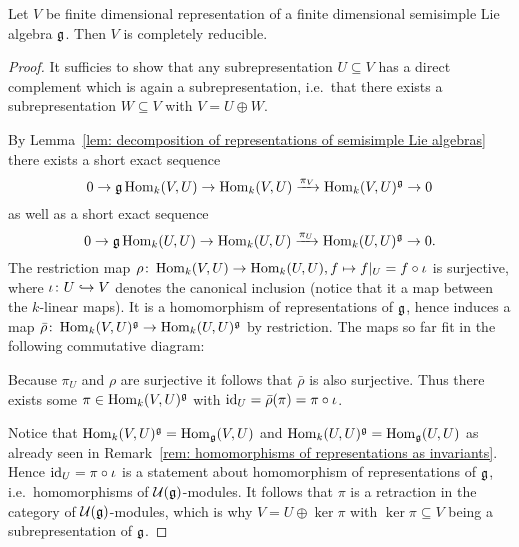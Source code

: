 \begin{thrm}[Weyl]
 Let $V$ be finite dimensional representation of a finite dimensional semisimple Lie algebra $\mathfrak{g}$. Then $V$ is completely reducible.
\end{thrm}
\begin{proof}
 It sufficies to show that any subrepresentation $U \subseteq V$ has a direct complement which is again a subrepresentation, i.e.\ that there exists a subrepresentation $W \subseteq V$ with $V = U \oplus W$.
 
 By Lemma~\ref{lem: decomposition of representations of semisimple Lie algebras} there exists a short exact sequence
 \[
  0 \to \mathfrak{g} \operatorname{Hom}_k(V, U) \to \operatorname{Hom}_k(V,U) \xrightarrow{\pi_V} \operatorname{Hom}_k(V,U)^{\mathfrak{g}} \to 0
 \]
 as well as a short exact sequence
 \[
  0 \to \mathfrak{g} \operatorname{Hom}_k(U, U) \to \operatorname{Hom}_k(U,U) \xrightarrow{\pi_U} \operatorname{Hom}_k(U,U)^{\mathfrak{g}} \to 0.
 \]
 The restriction map $\rho \colon \operatorname{Hom}_k(V,U) \to \operatorname{Hom}_k(U,U), f \mapsto f|_{U} = f \circ \iota$ is surjective, where $\iota \colon U \hookrightarrow V$ denotes the canonical inclusion (notice that it a map between the $k$-linear maps). It is a homomorphism of representations of $\mathfrak{g}$, hence induces a map $\bar{\rho} \colon \operatorname{Hom}_k(V,U)^{\mathfrak{g}} \to \operatorname{Hom}_k(U,U)^{\mathfrak{g}}$ by restriction. The maps so far fit in the following commutative diagram:
 \begin{center}
 \end{center}
 Because $\pi_U$ and $\rho$ are surjective it follows that $\bar{\rho}$ is also surjective. Thus there exists some $\pi \in \operatorname{Hom}_k(V,U)^{\mathfrak{g}}$ with $\operatorname{id}_U = \bar{\rho}(\pi) = \pi \circ \iota$.
 
 Notice that $\operatorname{Hom}_k(V,U)^{\mathfrak{g}} = \operatorname{Hom}_{\mathfrak{g}}(V,U)$ and $\operatorname{Hom}_k(U,U)^{\mathfrak{g}} = \operatorname{Hom}_{\mathfrak{g}}(U,U)$ as already seen in Remark~\ref{rem: homomorphisms of representations as invariants}. Hence $\operatorname{id}_U = \pi \circ \iota$ is a statement about homomorphism of representations of $\mathfrak{g}$, i.e.\ homomorphisms of $\mathcal{U}(\mathfrak{g})$-modules. It follows that $\pi$ is a retraction in the category of $\mathcal{U}(\mathfrak{g})$-modules, which is why $V = U \oplus \ker \pi$ with $\ker \pi \subseteq V$ being a subrepresentation of $\mathfrak{g}$.
\end{proof}


















